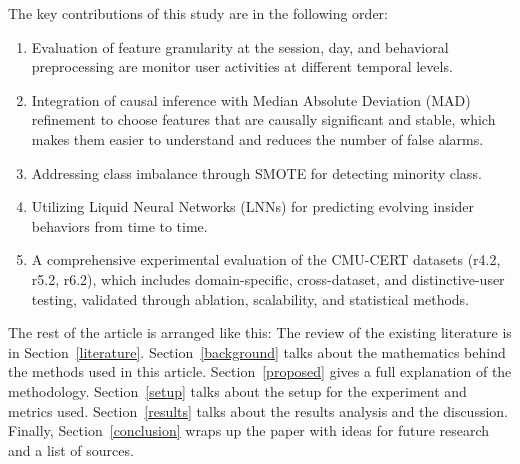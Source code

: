 The key contributions of this study are in the following order:
\begin{enumerate}
\item Evaluation of feature granularity at the session, day, and behavioral preprocessing are monitor user activities at different temporal levels.   
\item Integration of causal inference with Median Absolute Deviation (MAD) refinement to choose features that are causally significant and stable, which makes them easier to understand and reduces the number of false alarms.  
\item Addressing class imbalance through SMOTE for detecting minority class.
\item Utilizing Liquid Neural Networks (LNNs) for predicting evolving insider behaviors from time to time.  
\item A comprehensive experimental evaluation of the CMU-CERT datasets (r4.2, r5.2, r6.2), which includes domain-specific, cross-dataset, and distinctive-user testing, validated through ablation, scalability, and statistical methods.   
\end{enumerate}

 The rest of the article is arranged like this:   The review of the existing literature is in Section~\ref{literature}.   Section~\ref{background} talks about the mathematics behind the methods used in this article.   Section~\ref{proposed} gives a full explanation of the methodology.   Section~\ref{setup} talks about the setup for the experiment and metrics used.  Section~\ref{results} talks about the results analysis and the discussion.   Finally, Section~\ref{conclusion} wraps up the paper with ideas for future research and a list of sources.
